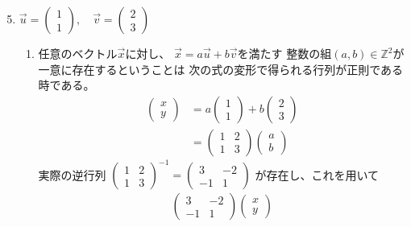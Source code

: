 \documentclass[12pt,b5paper]{ltjsarticle}
\begin{document}
\begin{enumerate}\setcounter{enumi}{4}
 \item
      $\vec{u} = \begin{pmatrix}1\\1\end{pmatrix},
      \quad \vec{v}=\begin{pmatrix}2\\3\end{pmatrix}$
      \begin{enumerate}\renewcommand{\theenumii}{\roman{enumii}}
       \item
            任意のベクトル$\vec{x}$に対し、
            $\vec{x}=a\vec{u}+b\vec{v}$を満たす
            整数の組$(a,b)\in\mathbb{Z}^2$が一意に存在するということは
            次の式の変形で得られる行列が正則である時である。
            \begin{align}
             \begin{pmatrix}x\\y\end{pmatrix}
                &= a\begin{pmatrix}1\\1\end{pmatrix}
               +b\begin{pmatrix}2\\3\end{pmatrix}\\
             &= \begin{pmatrix}1 & 2\\1 & 3\end{pmatrix}\begin{pmatrix}a\\b\end{pmatrix}
            \end{align}
            実際の逆行列
            $\begin{pmatrix}1 & 2\\1 & 3\end{pmatrix}^{-1}
             =\begin{pmatrix}3&-2\\-1&1\end{pmatrix}$
            が存在し、これを用いて
            \begin{align}
             \begin{pmatrix}3 & -2\\-1 & 1\end{pmatrix}\begin{pmatrix}x\\y\end{pmatrix}

\end{align}
\end{enumerate}
\end{enumerate}
\end{document}
